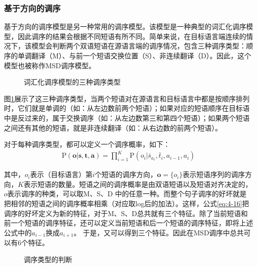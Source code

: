 
\subsubsection{基于方向的调序}

\parinterval 基于方向的调序模型是另一种常用的调序模型。该模型是一种典型的词汇化调序模型，因此调序的结果会根据不同短语有所不同。简单来说，在目标语言端连续的情况下，该模型会判断两个双语短语在源语言端的调序情况，包含三种调序类型：顺序的单调翻译（M）、与前一个短语交换位置（S）、非连续翻译（D）。因此，这个模型也被称作MSD调序模型\cite{Gros2008MSD}。

\begin{figure}[htp]
\centering

\caption{词汇化调序模型的三种调序类型}
\label{fig:4-21}
\end{figure}

\parinterval 图\ref{fig:4-21}展示了这三种调序类型，当两个短语对在源语言和目标语言中都是按顺序排列时，它们就是单调的（如：从左边数前两个短语）；如果对应的短语顺序在目标语中是反过来的，属于交换调序（如：从左边数第三和第四个短语）；如果两个短语之间还有其他的短语，就是非连续翻译（如：从右边数的前两个短语）。

\parinterval 对于每种调序类型，都可以定义一个调序概率，如下：
\begin{eqnarray}
\textrm{P}(\mathbf{o}|\mathbf{s},\mathbf{t},\mathbf{a}) = \prod_{i=1}^{K} \textrm{P}(o_i| \bar{s}_{a_i}, \bar{t}_i, a_{i-1}, a_i)
\label{eq:4-16}
\end{eqnarray}

\noindent 其中，$o_i$表示（目标语言）第$i$个短语的调序方向，$\mathbf{o}=\{o_i\}$表示短语序列的调序方向，$K$表示短语的数量。短语之间的调序概率是由双语短语以及短语对齐决定的，$o$表示调序的种类，可以取M、S、D 中的任意一种。而整个句子调序的好坏就是把相邻的短语之间的调序概率相乘（对应取log后的加法）。这样，公式\ref{eq:4-16}把调序的好坏定义为新的特征，对于M、S、D总共就有三个特征。除了当前短语和前一个短语的调序特征，还可以定义当前短语和后一个短语的调序特征，即将上述公式中的$a_{i-1}$换成$a_{i+1}$。 于是，又可以得到三个特征。因此在MSD调序中总共可以有6个特征。

\begin{figure}[htp]
\centering

\caption{调序类型的判断}
\label{fig:4-22}
\end{figure}

